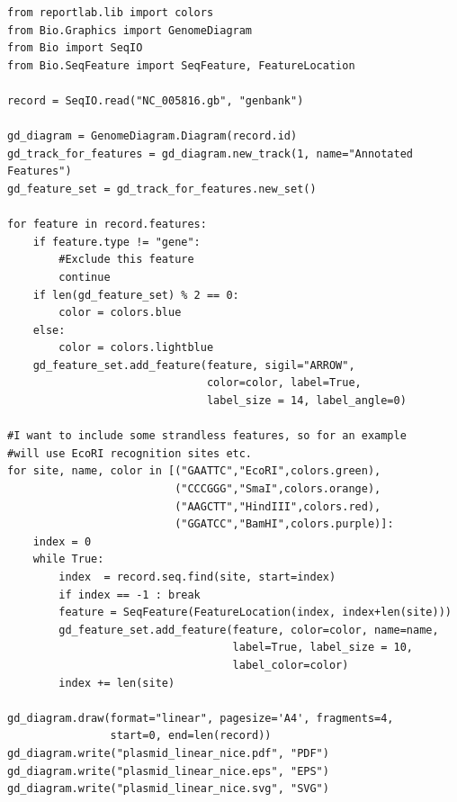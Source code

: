 \documentclass{report}
\begin{document}
\begin{verbatim}
from reportlab.lib import colors
from Bio.Graphics import GenomeDiagram
from Bio import SeqIO
from Bio.SeqFeature import SeqFeature, FeatureLocation

record = SeqIO.read("NC_005816.gb", "genbank")

gd_diagram = GenomeDiagram.Diagram(record.id)
gd_track_for_features = gd_diagram.new_track(1, name="Annotated Features")
gd_feature_set = gd_track_for_features.new_set()

for feature in record.features:
    if feature.type != "gene":
        #Exclude this feature
        continue
    if len(gd_feature_set) % 2 == 0:
        color = colors.blue
    else:
        color = colors.lightblue
    gd_feature_set.add_feature(feature, sigil="ARROW",
                               color=color, label=True,
                               label_size = 14, label_angle=0)

#I want to include some strandless features, so for an example
#will use EcoRI recognition sites etc.
for site, name, color in [("GAATTC","EcoRI",colors.green),
                          ("CCCGGG","SmaI",colors.orange),
                          ("AAGCTT","HindIII",colors.red),
                          ("GGATCC","BamHI",colors.purple)]:
    index = 0
    while True:
        index  = record.seq.find(site, start=index)
        if index == -1 : break
        feature = SeqFeature(FeatureLocation(index, index+len(site)))
        gd_feature_set.add_feature(feature, color=color, name=name,
                                   label=True, label_size = 10,
                                   label_color=color)
        index += len(site)

gd_diagram.draw(format="linear", pagesize='A4', fragments=4,
                start=0, end=len(record))
gd_diagram.write("plasmid_linear_nice.pdf", "PDF")
gd_diagram.write("plasmid_linear_nice.eps", "EPS")
gd_diagram.write("plasmid_linear_nice.svg", "SVG")
\end{verbatim}
\end{document}
